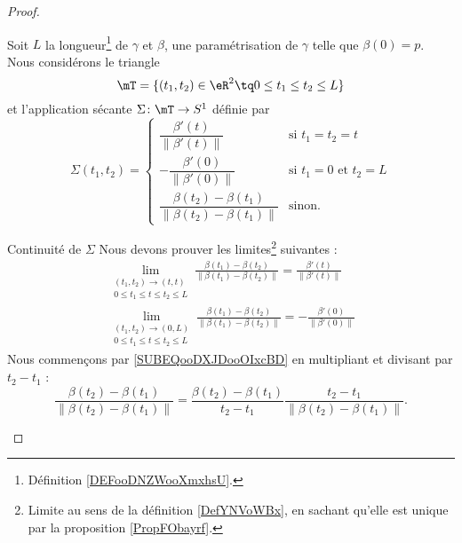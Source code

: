 \begin{proof}
\begin{subproof}
            Soit \( L\) la longueur\footnote{Définition \ref{DEFooDNZWooXmxhsU}.} de \( \gamma\) et \( \beta\), une paramétrisation de \( \gamma\) telle que \( \beta(0)=p\). Nous considérons le triangle
            \begin{equation}
                \mT=\{ (t_1,t_2)\in \eR^2\tq 0\leq t_1\leq t_2\leq L \}
            \end{equation}
            et l'application sécante \( \Sigma\colon \mT\to S^1\) définie par
            \begin{equation}
                \Sigma(t_1,t_2)=\begin{cases}
                    \dfrac{ \beta'(t) }{ \| \beta'(t) \| }    &   \text{si } t_1=t_2=t\\
                    -\dfrac{ \beta'(0) }{ \| \beta'(0) \| }    &   \text{si } t_1=0\text{ et } t_2=L\\
                    \dfrac{ \beta(t_2)-\beta(t_1) }{ \| \beta(t_2)-\beta(t_1) \| }    &   \text{sinon}.
                \end{cases}
            \end{equation}
    \item[Continuité de \( \Sigma\)]
        Nous devons prouver les limites\footnote{Limite au sens de la définition \ref{DefYNVoWBx}, en sachant qu'elle est unique par la proposition \ref{PropFObayrf}.} suivantes :
        \begin{subequations}
            \begin{align}
                \lim_{\substack{(t_1,t_2)\to (t,t)\\0\leq t_1\leq t\leq t_2\leq L}}\frac{ \beta(t_1)-\beta(t_2) }{ \| \beta(t_1)-\beta(t_2) \| }=\frac{ \beta'(t) }{ \| \beta'(t) \| }      \label{SUBEQooDXJDooOIxcBD}  \\
                \lim_{\substack{(t_1,t_2)\to (0,L)\\0\leq t_1\leq t\leq t_2\leq L}}\frac{ \beta(t_1)-\beta(t_2) }{ \| \beta(t_1)-\beta(t_2) \| }=-\frac{ \beta'(0) }{ \| \beta'(0) \| }        \label{SUBEQooOXGSooXHEHHh}
            \end{align}
        \end{subequations}
        Nous commençons par \eqref{SUBEQooDXJDooOIxcBD} en multipliant et divisant par \( t_2-t_1\) :
        \begin{equation}
            \frac{ \beta(t_2)-\beta(t_1) }{ \|  \beta(t_2)-\beta(t_1)  \| }=\frac{  \beta(t_2)-\beta(t_1)  }{ t_2-t_1 }\frac{ t_2-t_1 }{ \|  \beta(t_2)-\beta(t_1)  \| }.
        \end{equation}

\end{subproof}
\end{proof}
